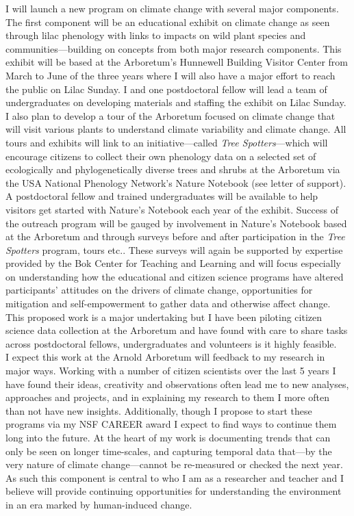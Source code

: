 \documentclass[12pt,a4paper,oneside]{article}
\begin{document}
I will launch a new program on climate change with several major components. The first component will be an educational exhibit on climate change as seen through lilac phenology with links to impacts on wild plant species and communities---building on concepts from both major research components. This exhibit will be based at the Arboretum's Hunnewell Building Visitor Center from March to June of the three years where I will also have a major effort to reach the public on Lilac Sunday. I and one postdoctoral fellow will lead a team of undergraduates on developing materials and staffing the exhibit on Lilac Sunday. I also plan to develop a tour of the Arboretum focused on climate change that will visit various plants to understand climate variability and climate change.  All tours and exhibits will link to an initiative---called \emph{Tree Spotters}---which will encourage citizens to collect their own phenology data on a selected set of ecologically and phylogenetically diverse trees and shrubs at the Arboretum via the USA National Phenology Network's Nature Notebook (see letter of support). A postdoctoral fellow and trained undergraduates will be available to help visitors get started with Nature's Notebook each year of the exhibit. Success of the outreach program will be gauged by involvement in Nature's Notebook based at the Arboretum and through surveys before and after participation in the \emph{Tree Spotters} program, tours etc.. These surveys will again be supported by expertise provided by the Bok Center for Teaching and Learning and will focus especially on understanding how the educational and citizen science programs have altered participants' attitudes on the drivers of climate change, opportunities for mitigation and self-empowerment to gather data and otherwise affect change. This proposed work is a major undertaking but I have been piloting citizen science data collection at the Arboretum and have found with care to share tasks across postdoctoral fellows, undergraduates and volunteers is it highly feasible. 
\vspace{1.5ex}\\
I expect this work at the Arnold Arboretum will feedback to my research in major ways. Working with a number of citizen scientists over the last 5 years I have found their ideas, creativity and observations often lead me to new analyses, approaches and projects, and in explaining my research to them I more often than not have new insights. Additionally, though I propose to start these programs via my NSF CAREER award I expect to find ways to continue them long into the future. At the heart of my work is documenting trends that can only be seen on longer time-scales, and capturing temporal data that---by the very nature of climate change---cannot be re-measured or checked the next year. As such this component is central to who I am as a researcher and teacher and I believe will provide continuing opportunities for understanding the environment in an era marked by human-induced change.
\end{document}
